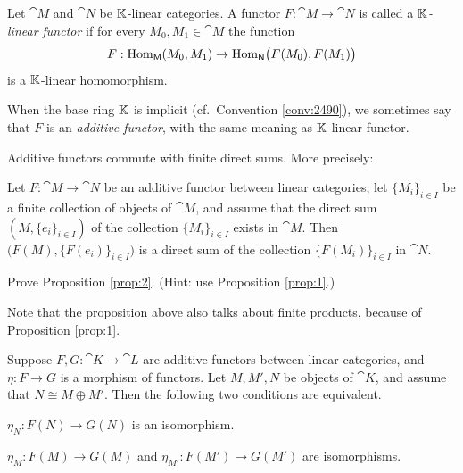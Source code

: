 \label{subsec:add-funcs}

\begin{dfn} \label{dfn:1031}
Let $\cat{M}$ and $\cat{N}$ be $\mathbb{K}$-linear categories. A functor 
$F : \cat{M} \to \cat{N}$ is called a {\em $\mathbb{K}$-linear functor}%
%
if for every $M_0, M_1 \in \cat{M}$ the function 
\[ F : \operatorname{Hom}_{\operatorname{\mathsf{M}}}(M_0, M_1) \to
\operatorname{Hom}_{\operatorname{\mathsf{N}}} \bigl( F(M_0), F(M_1) \bigr) \]
is a $\mathbb{K}$-linear homomorphism. 

When the base ring $\mathbb{K}$ is implicit (cf.\ Convention \ref{conv:2490}), 
we sometimes say that $F$ is an {\em additive functor}, with the same meaning 
as $\mathbb{K}$-linear functor. 
\end{dfn}

Additive functors commute with finite direct sums. More precisely:

\begin{prop} \label{prop:2}
Let $F : \cat{M} \to \cat{N}$ be an additive functor between linear categories,
let $\{ M_i \}_{i \in I}$ be a finite collection of objects of $\cat{M}$, and
assume that  the direct sum $(M, \{ e_i \}_{i \in I})$ of the collection 
$\{ M_i \}_{i \in I}$ exists in $\cat{M}$. Then 
$\big( F(M), \{ F(e_i) \}_{i \in I} \big)$ is a direct sum of the collection 
$\{ F(M_i) \}_{i \in I}$ in $\cat{N}$.  
\end{prop}

\begin{exer} \label{exer:1825}
Prove Proposition \ref{prop:2}. (Hint: use Proposition \ref{prop:1}.)
\end{exer}

Note that the proposition above also talks about finite products, because of 
Proposition \ref{prop:1}.

\begin{prop} \label{prop:3600}
Suppose 
$F, G : \cat{K} \to \cat{L}$
are additive functors between linear categories, and 
$\eta : F \to G$ is a morphism of functors. 
Let $M, M' , N$ be objects of $\cat{K}$, and assume that 
$N \cong M \oplus M'$. Then the following two conditions are equivalent. 
\begin{enumerate}
 $\eta_N : F(N) \to G(N)$ is an isomorphism. 

 $\eta_M : F(M) \to G(M)$ and 
$\eta_{M'} : F(M') \to G(M')$ are isomorphisms. 
\end{enumerate}
\end{prop}

